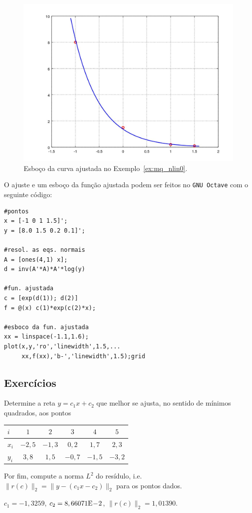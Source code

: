 \begin{ex}
\begin{figure}[h]
  \centering
  \includegraphics[width=\textwidth]{cap_ajuste/dados/ex_mq_nlin0/ex_mq_nlin0}
  \caption{Esboço da curva ajustada no Exemplo~\ref{ex:mq_nlin0}.}
  \label{fig:ex_mq_nlin0}
\end{figure}

\ifisoctave
O ajuste e um esboço da função ajustada podem ser feitos no \verb+GNU Octave+ com o seguinte código:
\begin{verbatim}
#pontos
x = [-1 0 1 1.5]';
y = [8.0 1.5 0.2 0.1]';

#resol. as eqs. normais
A = [ones(4,1) x];
d = inv(A'*A)*A'*log(y)

#fun. ajustada
c = [exp(d(1)); d(2)]
f = @(x) c(1)*exp(c(2)*x);

#esboco da fun. ajustada
xx = linspace(-1.1,1.6);
plot(x,y,'ro','linewidth',1.5,...
     xx,f(xx),'b-','linewidth',1.5);grid
\end{verbatim}
\fi

\end{ex}

\subsection*{Exercícios}

\begin{exer}\label{exer:mq_reta}
  Determine a reta $y = c_1x + c_2$ que melhor se ajusta, no sentido de mínimos quadrados, aos pontos
  \begin{center}
    \begin{tabular}{l|ccccc}
      $i$ & $1$ & $2$ & $3$ & $4$ & $5$ \\\hline
      $x_i$ & $-2,5$ & $-1,3$ & $0,2$ & $1,7$ & $2,3$\\
      $y_i$ & $3,8$ & $1,5$ & $-0,7$ & $-1,5$ & $-3,2$\\\hline
    \end{tabular}
  \end{center}
Por fim, compute a norma $L^2$ do resídulo, i.e. $\|r(c)\|_2 = \|y - (c_1x - c_2)\|_2$ para os pontos dados.
\end{exer}
\begin{resp}
  $c_1 = -1,3259$, $c_2 = 8,66071\mathrm{E}\!-\!2$, $\|r(c)\|_2 = 1,01390$.
\end{resp}

